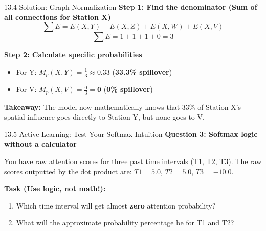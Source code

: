 \documentclass[aspectratio=169]{beamer}
\begin{document}
\begin{frame}{13.4 Solution: Graph Normalization}
  \textbf{Step 1: Find the denominator (Sum of all connections for Station X)}
  $$ \sum E = E(X,Y) + E(X,Z) + E(X,W) + E(X,V) $$
  $$ \sum E = 1 + 1 + 1 + 0 = 3 $$
  
  \textbf{Step 2: Calculate specific probabilities}
  \begin{itemize}
      \item For Y: $M_p(X, Y) = \frac{1}{3} \approx 0.33$ (\textbf{33.3\% spillover})
      \item For V: $M_p(X, V) = \frac{0}{3} = \mathbf{0} $ (\textbf{0\% spillover})
  \end{itemize}
  
  \vspace{0.3cm}
  \textbf{Takeaway:} The model now mathematically knows that 33\% of Station X's spatial influence goes directly to Station Y, but none goes to V.
\end{frame}

\begin{frame}{13.5 Active Learning: Test Your Softmax Intuition}
  \textbf{Question 3: Softmax logic without a calculator}
  
  You have raw attention scores for three past time intervals (T1, T2, T3). 
  The raw scores outputted by the dot product are: $T1 = 5.0$, $T2 = 5.0$, $T3 = -10.0$.
  
  \vspace{0.4cm}
  \textbf{Task (Use logic, not math!):}
  \begin{enumerate}
      \item Which time interval will get almost \textbf{zero} attention probability?
      \item What will the approximate probability percentage be for T1 and T2?
  \end{enumerate}
\end{frame}
\end{document}
